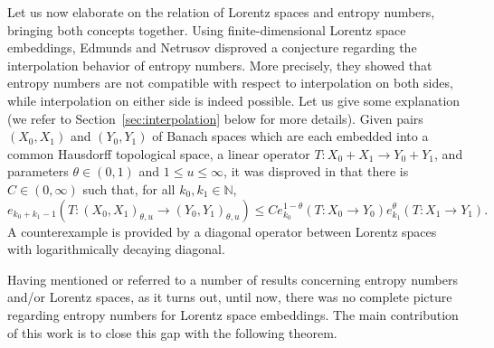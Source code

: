 \documentclass[a4paper,12pt]{article}
\theoremstyle{definition}
\newcommand{\IN}{\mathbb{N}}
\begin{document}
Let us now elaborate on the relation of Lorentz spaces and entropy numbers, bringing both concepts together. Using finite-dimensional Lorentz space embeddings, Edmunds and Netrusov \cite{EN11} disproved a conjecture regarding the interpolation behavior of entropy numbers. More precisely, they showed that entropy numbers are not compatible with respect to interpolation on both sides, while interpolation on either side is indeed possible. Let us give some explanation (we refer to Section~\ref{sec:interpolation} below for more details). Given pairs $(X_0,X_1)$ and $(Y_0,Y_1)$ of Banach spaces which are each embedded into a common Hausdorff topological space, a linear operator $T\colon X_0+X_1\to Y_0+Y_1$, and parameters $\theta\in (0,1)$ and $1\le u\le \infty$, it was disproved in \cite{EN11} that there is $C\in(0,\infty)$ such that, for all $k_0,k_1\in\IN$,
\[
e_{k_0+k_1-1}(T\colon (X_0,X_1)_{\theta,u}\to (Y_0,Y_1)_{\theta,u})
\le C e_{k_0}^{1-\theta}(T\colon X_0 \to Y_0) e_{k_1}^{\theta}(T\colon X_1 \to Y_1).
\]
A counterexample is provided by a diagonal operator between Lorentz spaces with logarithmically decaying diagonal. 

Having mentioned or referred to a number of results concerning entropy numbers and/or Lorentz spaces, as it turns out, until now, there was no complete picture regarding entropy numbers for Lorentz space embeddings. The main contribution of this work is to close this gap with the following theorem.
\end{document}
